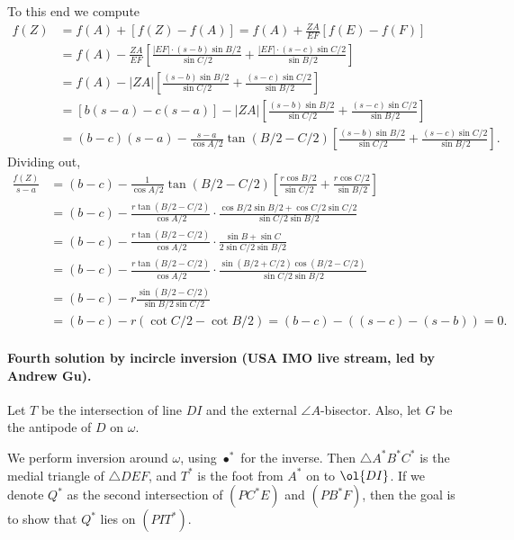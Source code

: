 \documentclass[11pt]{scrartcl}
\begin{document}
To this end we compute
\begin{align*}
  f(Z) &= f(A) + \left[ f(Z) - f(A) \right]
    = f(A) + \frac{ZA}{EF} \left[ f(E)-f(F) \right] \\
  &= f(A) - \frac{ZA}{EF}
  \left[ \frac{|EF| \cdot (s-b) \sin B/2}{\sin C/2}
    + \frac{|EF| \cdot (s-c) \sin C/2}{\sin B/2} \right] \\
  &= f(A) - |ZA| \left[ \frac{(s-b) \sin B/2}{\sin C/2}
    + \frac{(s-c) \sin C/2}{\sin B/2} \right] \\
  &= \left[ b(s-a) - c(s-a) \right]
    - |ZA| \left[ \frac{(s-b) \sin B/2}{\sin C/2}
    + \frac{(s-c) \sin C/2}{\sin B/2} \right] \\
  &= (b-c)(s-a) - \frac{s-a}{\cos A/2} \tan (B/2-C/2)
    \left[ \frac{(s-b) \sin B/2}{\sin C/2}
    + \frac{(s-c) \sin C/2}{\sin B/2} \right].
\end{align*}
Dividing out,
\begin{align*}
  \frac{f(Z)}{s-a}
  &= (b-c) - \frac{1}{\cos A/2} \tan (B/2-C/2)
    \left[ \frac{r \cos B/2}{\sin C/2}
      + \frac{r \cos C/2}{\sin B/2} \right] \\
  &= (b-c) - \frac{r \tan(B/2-C/2)}{\cos A/2}
    \cdot \frac{\cos B/2 \sin B/2 + \cos C/2 \sin C/2}%
    {\sin C/2 \sin B/2} \\
  &= (b-c) - \frac{r \tan(B/2-C/2)}{\cos A/2}
    \cdot \frac{\sin B + \sin C}%
    {2\sin C/2 \sin B/2} \\
  &= (b-c) - \frac{r \tan(B/2-C/2)}{\cos A/2}
    \cdot \frac{\sin(B/2+C/2)\cos(B/2-C/2)}
    {\sin C/2 \sin B/2} \\
  &= (b-c) - r \frac{\sin(B/2-C/2)}{\sin B/2 \sin C/2} \\
  &= (b-c) - r(\cot C/2 - \cot B/2)
    = (b-c) - \left( (s-c) - (s-b) \right) = 0.
\end{align*}

\paragraph{Fourth solution by incircle inversion (USA IMO live stream, led by Andrew Gu).}
Let $T$ be the intersection of line $DI$ and the external $\angle A$-bisector.
Also, let $G$ be the antipode of $D$ on $\omega$.

We perform inversion around $\omega$, using $\bullet^\ast$ for the inverse.
Then $\triangle A^\ast B^\ast C^\ast$ is the medial triangle of $\triangle DEF$,
and $T^\ast$ is the foot from $A^\ast$ on to $\ol{DI}$.
If we denote $Q^\ast$ as the second intersection
of $(PC^\ast E)$ and $(PB^\ast F)$,
then the goal is to show that $Q^\ast$ lies on $(PIT^\ast)$.
\end{document}
